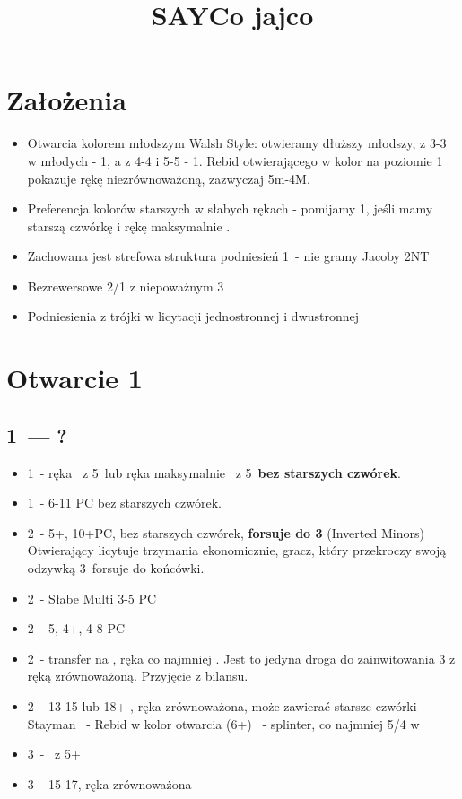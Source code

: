 \documentclass[12pt, a4paper]{article}
\title{\vspace{-2cm}SAYCo jajco}
\author{}
\date{}
\begin{document}
\maketitle
\section{Założenia}
\begin{itemize}
    \item Otwarcia kolorem młodszym Walsh Style: otwieramy dłuższy młodszy, z 3-3 w młodych - 1\clubs, a z 4-4 i
    5-5 - 1\diams. Rebid otwierającego w kolor na poziomie 1 pokazuje rękę niezrównoważoną, zazwyczaj 5m-4M.
    \item Preferencja kolorów starszych w słabych rękach - pomijamy 1\diams, jeśli mamy starszą czwórkę i rękę maksymalnie \inv.
    \item Zachowana jest strefowa struktura podniesień 1\major\ - nie gramy Jacoby 2NT
    \item Bezrewersowe 2/1 z niepoważnym 3\nt
    \item Podniesienia z trójki w licytacji jednostronnej i dwustronnej
\end{itemize}

\pagebreak

\section{Otwarcie 1\minor}
\subsection{1\clubs\ --- ?}
\begin{itemize}
    \item 1\diams\ - ręka \gf\ z 5\diams\ lub ręka maksymalnie \inv\ z 5\diams\ \textbf{bez starszych czwórek}.
    \item 1\nt\ - 6-11 PC bez starszych czwórek.
    \item 2\clubs\ - 5+\clubs, 10+PC, bez starszych czwórek, \textbf{forsuje do 3\clubs} (Inverted Minors)
        Otwierający licytuje trzymania ekonomicznie,
        gracz, który przekroczy swoją odzywką 3\clubs\ forsuje do końcówki.
    \item 2\diams\ - Słabe Multi 3-5 PC
    \item 2\hearts\ - 5\spades, 4+\hearts, 4-8 PC
    \item 2\spades\ - transfer na \nt, ręka co najmniej \inv. Jest to jedyna droga do zainwitowania 3\nt
        z ręką zrównoważoną. Przyjęcie z bilansu.
    \item 2\nt\ - 13-15 lub 18+ \gf, ręka zrównoważona, może zawierać starsze czwórki
    \clubs\ - Stayman
    \diams\ - Rebid w kolor otwarcia (6+\minor)
    \major\ - splinter, co najmniej 5/4 w \minor
    \item 3\clubs\ - \mixed\ z 5+\clubs\
    \item 3\nt\ - 15-17, ręka zrównoważona
\end{itemize}
\end{document}
